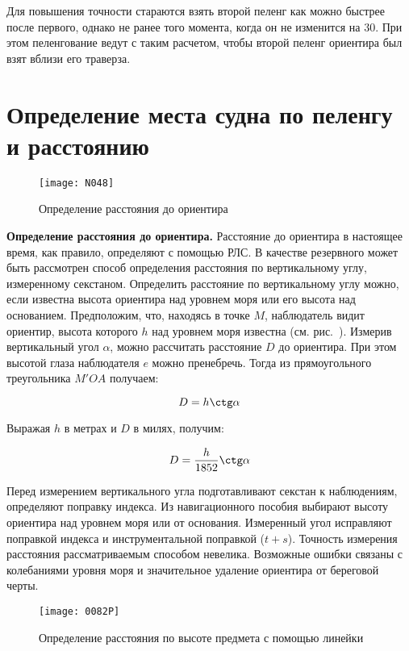 Для повышения точности стараются взять второй пеленг как можно быстрее после первого, однако не ранее того момента, когда он не изменится на 30\gr. При этом пеленгование ведут с таким расчетом, чтобы второй пеленг ориентира был взят вблизи его траверза. 

\section{Определение места судна по пеленгу и расстоянию}

\begin{figure}[htb]
  \centering{}
  \texttt{[image: N048]}
  \caption{Определение расстояния до ориентира}
  \label{fig:N48}
\end{figure}

\textbf{Определение расстояния до ориентира.} Расстояние до ориентира в настоящее время, как правило, определяют с помощью РЛС. В качестве резервного может быть рассмотрен способ определения расстояния по вертикальному углу, измеренному секстаном. Определить расстояние по вертикальному углу можно, если известна высота ориентира над уровнем моря или его высота над основанием. Предположим, что, находясь в точке $M$, наблюдатель видит ориентир, высота которого $h$ над уровнем моря известна (см. рис.~). Измерив вертикальный угол $\alpha$, можно рассчитать расстояние $D$ до ориентира. При этом высотой глаза наблюдателя $e$ можно пренебречь. Тогда из прямоугольного треугольника $M'OA$ получаем: 

\begin{equation}
  D = h \ctg \alpha 
\end{equation}

Выражая $h$ в метрах и $D$ в милях, получим: 

\begin{equation}
  D = \frac{h}{1852} \ctg \alpha 
\end{equation}

Перед измерением вертикального угла подготавливают секстан к наблюдениям, определяют поправку индекса. Из навигационного пособия выбирают высоту ориентира над уровнем моря или от основания. Измеренный угол исправляют поправкой индекса и инструментальной поправкой ($t + s$). Точность измерения расстояния рассматриваемым способом невелика. Возможные ошибки связаны с колебаниями уровня моря и значительное удаление ориентира от береговой черты. 

\begin{figure}[htb]
  \centering{}
  \texttt{[image: 0082P]}
  \caption{Определение расстояния по высоте предмета с помощью линейки}
  \label{fig:N48-1}
\end{figure}


